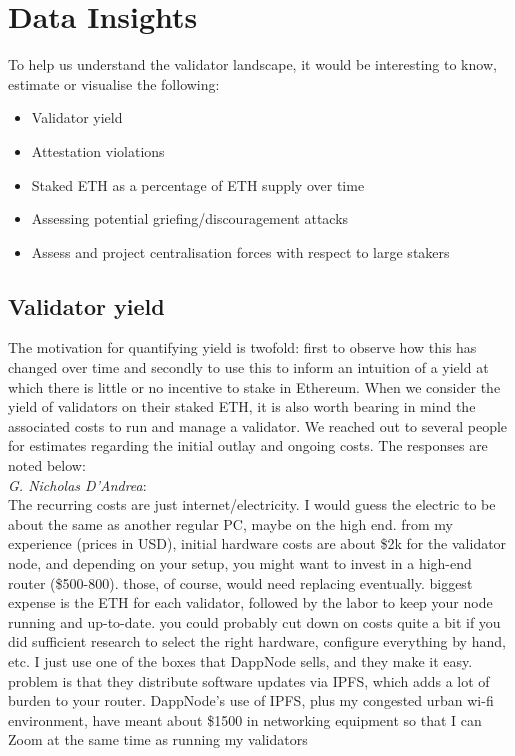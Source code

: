 \documentclass[UTF8]{article}
\begin{document}
\section{Data Insights}
\label{sec:insights}
To help us understand the validator landscape, it would be interesting to know, estimate or visualise the following:

\begin{itemize}
\item Validator yield
\item Attestation violations
\item Staked ETH as a percentage of ETH supply over time
\item Assessing potential griefing/discouragement attacks
\item Assess and project centralisation forces with respect to large stakers
\end{itemize}
\subsection{Validator yield}
\label{yield}
The motivation for quantifying yield is twofold: first to observe how this has changed over time and secondly to use this to inform an intuition of a yield at which there is little or no incentive to stake in Ethereum.
When we consider the yield of validators on their staked ETH, it is also worth bearing in mind the associated costs to run and manage a validator. 
We reached out to several people for estimates regarding the initial outlay and ongoing costs. The responses are noted below: \\
\noindent
\textit{G. Nicholas D'Andrea}: \\
The recurring costs are just internet/electricity. I would guess the electric to be about the same as another regular PC, maybe on the high end.
from my experience (prices in USD), initial hardware costs are about \$2k for the validator node, and depending on your setup, you might want to invest in a high-end router (\$500-800). those, of course, would need replacing eventually.
biggest expense is the ETH for each validator, followed by the labor to keep your node running and up-to-date. you could probably cut down on costs quite a bit if you did sufficient research to select the right hardware, configure everything by hand, etc.
I just use one of the boxes that DappNode sells, and they make it easy. problem is that they distribute software updates via IPFS, which adds a lot of burden to your router. DappNode's use of IPFS, plus my congested urban wi-fi environment, have meant about \$1500 in networking equipment so that I can Zoom at the same time as running my validators
\end{document}
